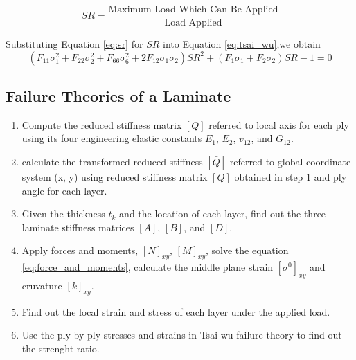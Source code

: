 \documentclass[smallextended]{svjour3}       %
\begin{document}
\begin{equation} \label{eq:sr}
	S R=\frac{\text {Maximum Load Which Can Be Applied}}{\text {Load Applied}}
\end{equation}


Substituting Equation \ref{eq:sr} for $SR$ into Equation \ref{eq:tsai_wu},we obtain
\begin{equation}
		(F_{11}\sigma_1^2+F_{22}\sigma_2^2+F_{66}\sigma_6^2+2F_{12}\sigma_1\sigma_2)SR^2 
						 +(F_1\sigma_1+F_2\sigma_2)SR-1=0
\end{equation}




\subsection{Failure Theories of a Laminate}

\begin{enumerate}
	\item Compute the reduced stiffness matrix $[Q]$ referred to local axis for each ply using its
		four engineering elastic constants $E_1$, $E_2$, $v_{12}$, and $G_{12}$.
	\item calculate the transformed reduced stiffness $[\bar{Q}]$ referred to global coordinate
		system (x, y) using reduced stiffness matrix $[Q]$ obtained in step 1 and ply angle for each layer.
	\item Given the thickness $t_k$ and the location of each layer, find out the three laminate
		stiffness matrices $[A]$, $[B]$, and $[D]$.
	\item Apply forces and moments, $[N]_{xy}$, $[M]_{xy}$, solve the equation
		\ref{eq:force_and_moments}, calculate the middle plane strain $[\sigma^0]_{xy}$ and
		cruvature $[k]_{xy}$.
	\item Find out the local strain and stress of each layer under the applied load.
	\item Use the ply-by-ply stresses and strains in Tsai-wu failure theory to find out the strenght
		ratio.
\end{enumerate}
\end{document}
